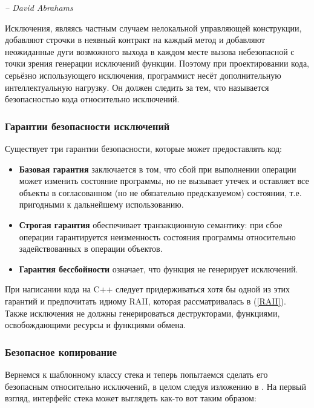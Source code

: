 \documentclass[a4paper,12pt,oneside]{article}
\begin{document}
\hfill\textit{-- David Abrahams}

Исключения, являясь частным случаем нелокальной управляющей конструкции, добавляют строчки в неявный контракт на каждый метод и добавляют неожиданные дуги возможного выхода в каждом месте вызова небезопасной с точки зрения генерации исключений функции. Поэтому при проектировании кода, серьёзно использующего исключения, программист несёт дополнительную интеллектуальную нагрузку. Он должен следить за тем, что называется безопасностью кода относительно исключений.

\subsubsection{Гарантии безопасности исключений}\label{SafetyGuarantees}

Существует три гарантии безопасности, которые может предоставлять код:

\begin{itemize}
\item
\textbf{Базовая гарантия} заключается в том, что сбой при выполнении операции может изменить состояние программы, но не вызывает утечек и оставляет все объекты в согласованном (но не обязательно предсказуемом) состоянии, т.е. пригодными к дальнейшему использованию.
\item
\textbf{Строгая гарантия} обеспечивает транзакционную семантику: при сбое операции гарантируется неизменность состояния программы относительно задействованных в операции объектов.
\item
\textbf{Гарантия бессбойности} означает, что функция не генерирует исключений.
\end{itemize}

При написании кода на C++ следует придерживаться хотя бы одной из этих гарантий и предпочитать идиому RAII, которая рассматривалась в (\ref{RAII}). Также исключения не должны генерироваться деструкторами, функциями, освобождающими ресурсы и функциями обмена.

\subsubsection{Безопасное копирование}\label{SafeCopying}

Вернемся к шаблонному классу стека и теперь попытаемся сделать его безопасным относительно исключений, в целом следуя изложению в \cite{exceptionalcpp}. На первый взгляд, интерфейс стека может выглядеть как-то вот таким образом:
\end{document}
